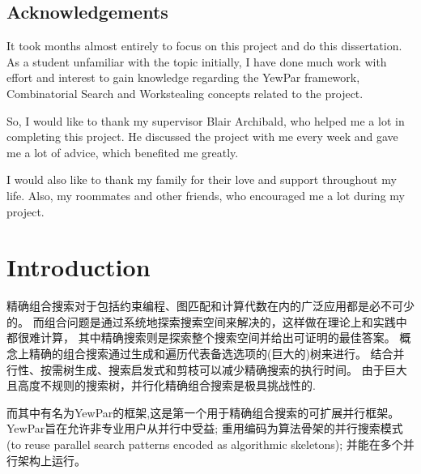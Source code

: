 \documentclass{mproj}
\begin{document}
\educationalconsent



\newpage
\section*{Acknowledgements}

It took months almost entirely to focus on this project and do this dissertation.
As a student unfamiliar with the topic initially,
I have done much work with effort and interest to gain knowledge regarding the YewPar framework,
Combinatorial Search and Workstealing concepts related to the project.

So, I would like to thank my supervisor Blair Archibald, who helped me a lot in completing this project.
He discussed the project with me every week and gave me a lot of advice, which benefited me
greatly.

I would also like to thank my family for their love and support throughout my life. Also, my
roommates and other friends, who encouraged me a lot during my project.

\tableofcontents

\chapter{Introduction}\label{intro}

精确组合搜索对于包括约束编程、图匹配和计算代数在内的广泛应用都是必不可少的。
而组合问题是通过系统地探索搜索空间来解决的，这样做在理论上和实践中都很难计算，
其中精确搜索则是探索整个搜索空间并给出可证明的最佳答案。
概念上精确的组合搜索通过生成和遍历代表备选选项的(巨大的)树来进行。
结合并行性、按需树生成、搜索启发式和剪枝可以减少精确搜索的执行时间。
由于巨大且高度不规则的搜索树，并行化精确组合搜索是极具挑战性的.

而其中有名为YewPar\cite{10.1145/3332466.3374537}的框架,这是第一个用于精确组合搜索的可扩展并行框架。
YewPar旨在允许非专业用户从并行中受益;
重用编码为算法骨架的并行搜索模式(to reuse parallel search patterns encoded as algorithmic skeletons);
并能在多个并行架构上运行。
\end{document}

